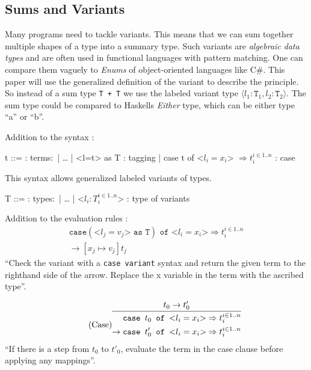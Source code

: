 \subsection{Sums and Variants}
\label{subsec:variants}

Many programs need to tackle variants. This means
that we can sum together multiple shapes of a type into a summary
type. Such variants are \textit{algebraic data types} and are often used in functional
languages with pattern matching. One can compare them vaguely to \textit{Enums} of
object-oriented languages like C\#.
This paper will use the generalized definition
of the variant to describe the principle. So instead of a sum type \texttt{T + T}
we use the labeled variant type $\langle l_1 \colon \texttt{T}_1, l_2 \colon \texttt{T}_2 \rangle$.
The sum type could be compared to Haskells \textit{Either} type, which can be
either type ``a'' or ``b''.

Addition to the syntax \cite{pierce2002ProgLang}:
\begin{bnfgrammar}
    t ::= : terms$\colon$
    | \dots
    | <l=t> as T : tagging
    | case t of <$l_i=x_i$> $\Rightarrow t_i^{i \in 1..n}$ : case
\end{bnfgrammar}\leavevmode\newline
This syntax allows generalized labeled variants of types.

\begin{bnfgrammar}
    T ::= : types$\colon$
    | \dots
    | <$l_i \colon T_i^{i \in 1..n}$> : type of variants
\end{bnfgrammar}\leavevmode\newline

Addition to the evaluation rules \cite{pierce2002ProgLang}:
\begin{equation*}
    \tag{Case variant}
    \begin{split}
        \texttt{case} (\text{<}l_j=v_j\text{>} \texttt{ as } \texttt{T}) \texttt{ of } \text{<}l_i=x_i\text{>} \Rightarrow t_i^{i \in 1..n} \\
        \rightarrow [x_j \mapsto v_j]t_j
    \end{split}
\end{equation*}
``Check the variant with a \texttt{case variant} syntax and return
the given term to the righthand side of the arrow. Replace the
x variable in the term with the ascribed type''.

\begin{equation*}
    \tag{Case}
    \infer{
        \begin{split}
            \texttt{case } t_0 \texttt{ of } \text{<}l_i=x_i\text{>} \Rightarrow t_i^{i \in 1..n} \\
            \rightarrow \texttt{case } t'_0 \texttt{ of } \text{<}l_i=x_i\text{>} \Rightarrow t_i^{i \in 1..n}
        \end{split}
    }{
        t_0 \rightarrow t'_0
    }
\end{equation*}
``If there is a step from $t_0$ to $t'_0$, evaluate the term
in the case clause before applying any mappings''.

